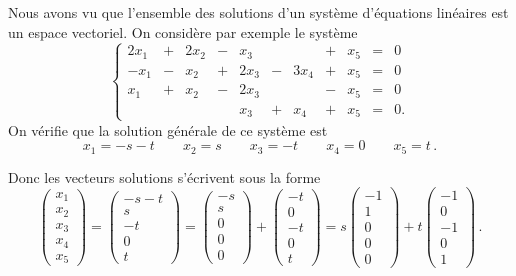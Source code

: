 \documentclass[class=report,crop=false]{standalone}
\begin{document}
\begin{exemple}
Nous avons vu que l'ensemble des solutions d'un système
d'équations linéaires  est un espace vectoriel.
On considère par exemple le système
\[ \left\{
\begin{array}{ccccccccccc}
2x_1 &+ &2x_2 &- &x_3 &&&+ &x_5 & = & 0\\
-x_1 &- &x_2 &+ &2x_3 &- &3x_4 &+ &x_5 & = &0\\
x_1 &+ &x_2 &- &2x_3 &&&- &x_5 & = & 0\\
&&&&x_3 &+ &x_4 &+ &x_5 & = & 0.
\end{array} \right.
\]
On vérifie que la solution générale de ce système est
$$ x_1 = -s-t\qquad x_2 = s\qquad x_3 = -t\qquad x_4 = 0\qquad x_5 = t\, .$$

Donc les vecteurs solutions s'écrivent sous la forme
$$ \left( \begin{smallmatrix} x_1\\x_2\\x_3\\x_4\\x_5\end{smallmatrix}\right)
=  \left( \begin{smallmatrix} -s-t\\s\\-t\\ 0\\t\end{smallmatrix}\right)
=  \left( \begin{smallmatrix} -s\\s\\0\\0\\0\end{smallmatrix}\right)
+  \left( \begin{smallmatrix} -t\\0\\-t\\0\\t\end{smallmatrix}\right)
= s  \left( \begin{smallmatrix} -1\\1\\0\\0\\0\end{smallmatrix}\right)
+ t \left( \begin{smallmatrix} -1\\0\\-1\\0\\1\end{smallmatrix}\right)\, .$$


\end{exemple}
\end{document}
